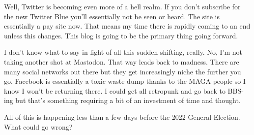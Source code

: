 Well, Twitter is becoming even more of a hell realm. If you don't
subscribe for the new Twitter Blue you'll essentially not be seen or
heard. The site is essentially a pay site now. That means my time there
is rapidly coming to an end unless this changes. This blog is going to
be the primary thing going forward.

I don't know what to say in light of all this sudden shifting, really.
No, I'm not taking another shot at Mastodon. That way leads back to
madness. There are many social networks out there but they get
increasingly niche the further you go. Facebook is essentially a toxic
waste dump thanks to the MAGA people so I know I won't be returning
there. I could get all retropunk and go back to BBS-ing but that's
something requiring a bit of an investment of time and thought.

All of this is happening less than a few days before the 2022 General
Election. What could go wrong?
